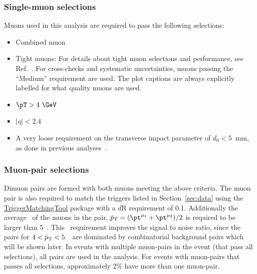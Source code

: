 \subsubsection{Single-muon selections}
Muons used in this analysis are required to pass the following selections:

\begin{itemize}
  \item Combined muon
  \item Tight muons:
        For details about tight muon selections and performance,
          see Ref.~\cite{PERF-2015-10}.
        For cross-checks and systematic uncertainties, muons passing the
          ``Medium'' requirement are used.
        The plot captions are always explicitly labelled for what quality muons are used.
  \item $\pT > 4~\GeV$
  \item $ |\eta| < 2.4$
  \item A very loose requirement on the transverse impact parameter of $d_0<5$~mm,  as done in previous analyses~\cite{HION-2015-06}.
\end{itemize}




\subsubsection{Muon-pair selections\label{sec:muon_pair_selections}}
Dimuon pairs are formed with both muons meeting the above criteria.
The muon pair is also required to match the triggers listed in 
  Section~\ref{sec:data} using the 
  \href{https://twiki.cern.ch/twiki/bin/view/Atlas/XAODMatchingTool}{TriggerMatchingTool} 
  package with a $d\mathrm{R}$ requirement of 0.1.
Additionally the average \pt\ of the muons in the pair, 
  $\ptbar=(\pt^{\mu_1}+\pt^{\mu_2})/2$ is required to be larger than 5~\GeV.
This \ptbar\ requirement improves the signal to noise ratio, since 
  the pairs for $4<\mbox{$\bar{p}_{\mathrm{T}}$}<5$~\GeV\ are dominated by combinatorial
  background pairs which will be shown later.
In events with multiple muon-pairs in the event (that pass all selections),
  all pairs are used in the analysis.
For events with muon-pairs that passes all selections,
  approximately 2\% have more than one muon-pair.


